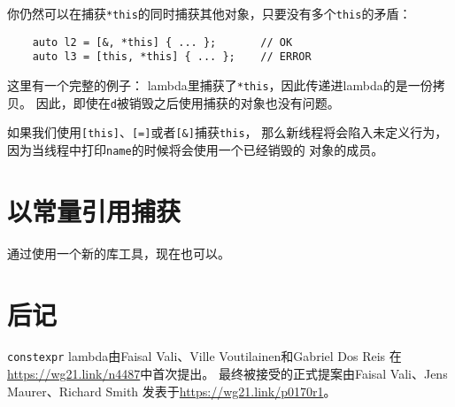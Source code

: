 你仍然可以在捕获\texttt{*this}的同时捕获其他对象，只要没有多个\texttt{this}的矛盾：
\begin{lstlisting}
    auto l2 = [&, *this] { ... };       // OK
    auto l3 = [this, *this] { ... };    // ERROR
\end{lstlisting}
这里有一个完整的例子：
lambda里捕获了\texttt{*this}，因此传递进lambda的是一份拷贝。
因此，即使在\texttt{d}被销毁之后使用捕获的对象也没有问题。

如果我们使用\texttt{[this]}、\texttt{[=]}或者\texttt{[\&]}捕获\texttt{this}，
那么新线程将会陷入未定义行为，因为当线程中打印\texttt{name}的时候将会使用一个已经销毁的
对象的成员。


\section{以常量引用捕获}
通过使用一个新的库工具，现在也可以。


\section{后记}
\texttt{constexpr} lambda由Faisal Vali、Ville Voutilainen和Gabriel Dos Reis
在\url{https://wg21.link/n4487}中首次提出。
最终被接受的正式提案由Faisal Vali、Jens Maurer、Richard Smith
发表于\url{https://wg21.link/p0170r1}。